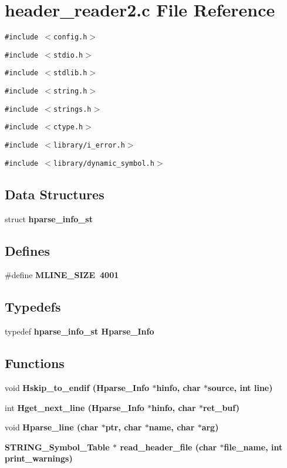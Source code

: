\section{header\_\-reader2.c File Reference}
\label{header__reader2_8c}
{\tt \#include $<$config.h$>$}\par
{\tt \#include $<$stdio.h$>$}\par
{\tt \#include $<$stdlib.h$>$}\par
{\tt \#include $<$string.h$>$}\par
{\tt \#include $<$strings.h$>$}\par
{\tt \#include $<$ctype.h$>$}\par
{\tt \#include $<$library/i\_\-error.h$>$}\par
{\tt \#include $<$library/dynamic\_\-symbol.h$>$}\par
\subsection*{Data Structures}
\begin{CompactItemize}
\item 
struct \bf{hparse\_\-info\_\-st}
\end{CompactItemize}
\subsection*{Defines}
\begin{CompactItemize}
\item 
\#define \bf{MLINE\_\-SIZE}~4001
\end{CompactItemize}
\subsection*{Typedefs}
\begin{CompactItemize}
\item 
typedef \bf{hparse\_\-info\_\-st} \bf{Hparse\_\-Info}
\end{CompactItemize}
\subsection*{Functions}
\begin{CompactItemize}
\item 
void \bf{Hskip\_\-to\_\-endif} (\bf{Hparse\_\-Info} $\ast$hinfo, char $\ast$source, int line)
\item 
int \bf{Hget\_\-next\_\-line} (\bf{Hparse\_\-Info} $\ast$hinfo, char $\ast$ret\_\-buf)
\item 
void \bf{Hparse\_\-line} (char $\ast$ptr, char $\ast$\bf{name}, char $\ast$arg)
\item 
\bf{STRING\_\-Symbol\_\-Table} $\ast$ \bf{read\_\-header\_\-file} (char $\ast$file\_\-name, int print\_\-warnings)
\end{CompactItemize}


